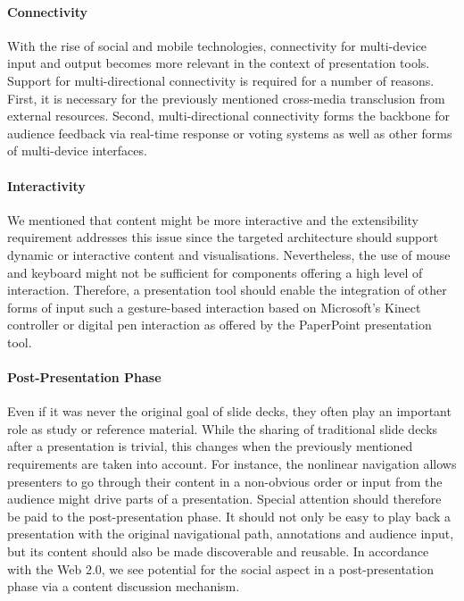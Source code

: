      \paragraph{Connectivity} With the rise of social and mobile technologies,
      connectivity for multi-device input and output becomes more relevant in
      the context of presentation tools. Support for multi-directional
      connectivity is required for a number of reasons. First, it is necessary
      for the previously mentioned cross-media transclusion from external
      resources. Second, multi-directional connectivity forms the backbone for
      audience feedback via real-time response or voting systems
      \citep{dufresne-1} as well as other forms of multi-device interfaces.

     \paragraph{Interactivity} We mentioned that content might be more
      interactive and the extensibility requirement addresses this issue since
      the targeted architecture should support dynamic or interactive content
      and visualisations. Nevertheless, the use of mouse and keyboard might not
      be sufficient for components offering a high level of interaction.
      Therefore, a presentation tool should enable the integration of other
      forms of input such a gesture-based interaction based on Microsoft's
      Kinect controller or digital pen interaction \citep{signer-2} as offered
      by the PaperPoint \citep{signer-1} presentation tool.

     \paragraph{Post-Presentation Phase} Even if it was never the original goal
      of slide decks, they often play an important role as study or reference
      material. While the sharing of traditional slide decks after a
      presentation is trivial, this changes when the previously mentioned
      requirements are taken into account. For instance, the nonlinear
      navigation allows presenters to go through their content in a non-obvious
      order or input from the audience might drive parts of a presentation.
      Special attention should therefore be paid to the post-presentation
      phase. It should not only be easy to play back a presentation with the
      original navigational path, annotations and audience input, but its
      content should also be made discoverable and reusable. In accordance with
      the Web 2.0, we see potential for the social aspect in a
      post-presentation phase via a content discussion mechanism.

